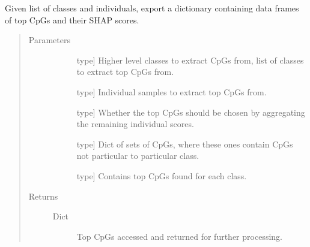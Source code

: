 \documentclass[letterpaper,10pt,english]{sphinxmanual}
\begin{document}
\begin{fulllineitems}
\begin{fulllineitems}
\label{\detokenize{index:methylnet.interpretation_classes.ShapleyDataExplorer.return_top_cpgs}}
Given list of classes and individuals, export a dictionary containing data frames of top CpGs and their SHAP scores.
\begin{quote}\begin{description}
\item[{Parameters}] \leavevmode\begin{description}
\item[{}] \leavevmode{[}type{]}
Higher level classes to extract CpGs from, list of classes to extract top CpGs from.

\item[{}] \leavevmode{[}type{]}
Individual samples to extract top CpGs from.

\item[{}] \leavevmode{[}type{]}
Whether the top CpGs should be chosen by aggregating the remaining individual scores.

\item[{}] \leavevmode{[}type{]}
Dict of sets of CpGs, where these ones contain CpGs not particular to particular class.

\item[{}] \leavevmode{[}type{]}
Contains top CpGs found for each class.

\end{description}

\item[{Returns}] \leavevmode\begin{description}
\item[{Dict}] \leavevmode
Top CpGs accessed and returned for further processing.

\end{description}

\end{description}\end{quote}

\end{fulllineitems}



\end{fulllineitems}
\end{document}
